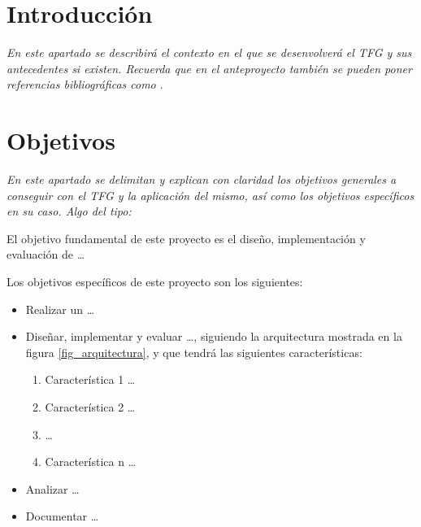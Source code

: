 

\section{Introducción}
\label{sec:introduccion}

\textit{En este apartado se describirá el contexto en el que se desenvolverá el
  TFG y sus antecedentes si existen. Recuerda que en el anteproyecto
  también se pueden poner referencias bibliográficas como \cite{moore2002}}.


\section{Objetivos}
\label{sec:objetivos-y-campo}

\textit{En este apartado se delimitan y explican con claridad los objetivos
  generales a conseguir con el TFG y la aplicación del mismo, así como los
  objetivos específicos en su caso. Algo del tipo:}

El objetivo fundamental de este proyecto es el diseño, implementación y
evaluación de \ldots

Los objetivos específicos de este proyecto son los siguientes:

\begin{itemize}
\item Realizar un  \ldots
\item Diseñar, implementar y evaluar  \ldots, siguiendo la arquitectura
  mostrada en la figura \ref{fig_arquitectura}, y que tendrá las
  siguientes características:

  \begin{enumerate}
  \item Característica 1 \ldots
  \item Característica 2 \ldots
  \item  \ldots
  \item Característica n \ldots
  \end{enumerate}

\item Analizar  \ldots

\item Documentar  \ldots

\end{itemize}

